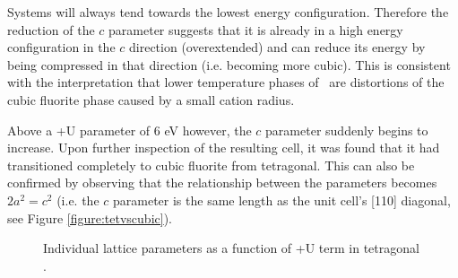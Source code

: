 Systems will always tend towards the lowest energy configuration. Therefore the reduction of the $c$ parameter suggests that it is already in a high energy configuration in the $c$ direction (overextended) and can reduce its energy by being compressed in that direction (i.e. becoming more cubic). This is consistent with the interpretation that lower temperature phases of \zirconia\ are distortions of the cubic fluorite phase caused by a small cation radius. 

Above a +U parameter of 6 eV however, the $c$ parameter suddenly begins to increase. Upon further inspection of the resulting cell, it was found that it had transitioned completely to cubic fluorite from tetragonal. This can also be confirmed by observing that the relationship between the parameters becomes $2a^2 = c^2$ (i.e. the $c$ parameter is the same length as the unit cell's [110] diagonal, see Figure \ref{figure:tetvscubic}).

\begin{figure}[ht] %
\begin{center}
		\caption{Individual lattice parameters as a function of +U term in tetragonal \zirconia .}
		\label{Figure:plusutet}
	\end{center}
\end{figure}

